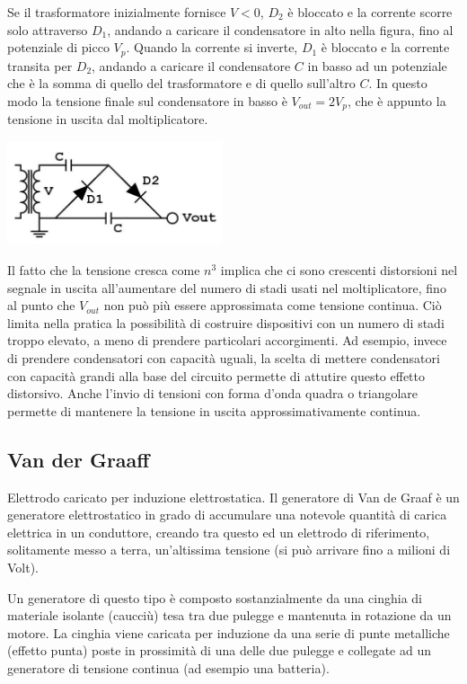 \documentclass[a4paper,11pt,twoside,openany]{book}
\theoremstyle{definition}
\theoremstyle{plain}
\theoremstyle{plain}
\theoremstyle{definition}
\begin{document}
Se il trasformatore inizialmente fornisce $V<0$, $D_2$ è bloccato e la corrente scorre solo attraverso $D_1$, andando a caricare il condensatore in alto nella figura, fino al potenziale di picco $V_p$. Quando la corrente si inverte, $D_1$ è bloccato e la corrente transita per $D_2$, andando a caricare il condensatore $C$ in basso ad un potenziale che è la somma di quello del trasformatore e di quello sull'altro $C$. In questo modo la tensione finale sul condensatore in basso è $V_{out}=2V_p$, che è appunto la tensione in uscita dal moltiplicatore.

\begin{center}
\includegraphics[width=2.5in]{immagini/Cockroft-Walton.jpg} %
\end{center}

Il fatto che la tensione  cresca come $n^3$ implica che ci sono crescenti distorsioni nel segnale in uscita all'aumentare del numero di stadi usati nel moltiplicatore, fino al punto che $V_{out}$ non può più essere approssimata come tensione continua. Ciò limita nella pratica la possibilità di costruire dispositivi con un numero di stadi troppo elevato, a meno di prendere particolari accorgimenti. Ad esempio, invece di prendere condensatori con capacità uguali, la scelta di mettere condensatori con capacità grandi alla base del circuito permette di attutire questo effetto distorsivo. Anche l'invio di tensioni con forma d'onda quadra o triangolare permette di mantenere la tensione in uscita approssimativamente continua.

\subsection{Van der Graaff} %
Elettrodo caricato per induzione elettrostatica. Il generatore di Van de Graaf è un generatore elettrostatico in grado di accumulare una notevole quantità di carica elettrica in un conduttore, creando tra questo ed un elettrodo di riferimento, solitamente messo a terra, un'altissima tensione (si può arrivare fino a milioni di Volt).

Un generatore di questo tipo è composto sostanzialmente da una cinghia di materiale isolante (caucciù) tesa tra due pulegge e mantenuta in rotazione da un motore. La cinghia viene caricata per induzione da una serie di punte metalliche (effetto punta) poste in prossimità di una delle due pulegge e collegate ad un generatore di tensione continua (ad esempio una batteria).
\end{document}
